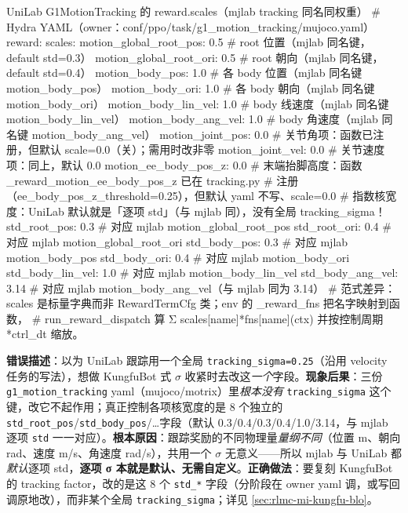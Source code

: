 \begin{codebox}[Python]{UniLab G1MotionTracking 的 reward.scales（mjlab tracking 同名同权重）}
# Hydra YAML（owner：conf/ppo/task/g1_motion_tracking/mujoco.yaml）
reward:
  scales:
    motion_global_root_pos: 0.5     # root 位置（mjlab 同名键，default std=0.3）
    motion_global_root_ori: 0.5     # root 朝向（mjlab 同名键，default std=0.4）
    motion_body_pos: 1.0            # 各 body 位置（mjlab 同名键 motion_body_pos）
    motion_body_ori: 1.0            # 各 body 朝向（mjlab 同名键 motion_body_ori）
    motion_body_lin_vel: 1.0        # body 线速度（mjlab 同名键 motion_body_lin_vel）
    motion_body_ang_vel: 1.0        # body 角速度（mjlab 同名键 motion_body_ang_vel）
    motion_joint_pos: 0.0           # 关节角项：函数已注册，但默认 scale=0.0（关）；需用时改非零
    motion_joint_vel: 0.0           # 关节速度项：同上，默认 0.0
    motion_ee_body_pos_z: 0.0       # 末端抬脚高度：函数 _reward_motion_ee_body_pos_z 已在 tracking.py
                                    # 注册（ee_body_pos_z_threshold=0.25），但默认 yaml 不写、scale=0.0
  # 指数核宽度：UniLab 默认就是「逐项 std」（与 mjlab 同），没有全局 tracking_sigma！
  std_root_pos:  0.3               # 对应 mjlab motion_global_root_pos
  std_root_ori:  0.4               # 对应 mjlab motion_global_root_ori
  std_body_pos:  0.3               # 对应 mjlab motion_body_pos
  std_body_ori:  0.4               # 对应 mjlab motion_body_ori
  std_body_lin_vel: 1.0            # 对应 mjlab motion_body_lin_vel
  std_body_ang_vel: 3.14           # 对应 mjlab motion_body_ang_vel（与 mjlab 同为 3.14）
# 范式差异：scales 是标量字典而非 RewardTermCfg 类；env 的 _reward_fns 把名字映射到函数，
# run_reward_dispatch 算 Σ scales[name]*fns[name](ctx) 并按控制周期 *ctrl_dt 缩放。
\end{codebox}

\begin{pitfall}
\textbf{错误描述}：以为 UniLab 跟踪用一个全局 \verb|tracking_sigma=0.25|（沿用 velocity 任务的写法），想做 KungfuBot 式 $\sigma$ 收紧时去改这\emph{一个}字段。\textbf{现象后果}：三份 \verb|g1_motion_tracking| yaml（mujoco/motrix）里\emph{根本没有} \verb|tracking_sigma| 这个键，改它不起作用；真正控制各项核宽度的是 8 个独立的 \verb|std_root_pos|/\verb|std_body_pos|/\dots 字段（默认 0.3/0.4/0.3/0.4/1.0/3.14，与 mjlab 逐项 \verb|std| 一一对应）。\textbf{根本原因}：跟踪奖励的不同物理量\emph{量纲不同}（位置 m、朝向 rad、速度 m/s、角速度 rad/s），共用一个 $\sigma$ 无意义——所以 mjlab 与 UniLab 都\emph{默认}逐项 std，\textbf{逐项 σ 本就是默认、无需自定义}。\textbf{正确做法}：要复刻 KungfuBot 的 tracking factor，改的是这 8 个 \verb|std_*| 字段（分阶段在 owner yaml 调，或写回调原地改），而非某个全局 \verb|tracking_sigma|；详见 \cref{sec:rlmc-mi-kungfu-blo}。\end{pitfall}

